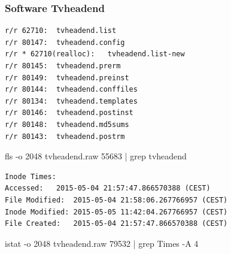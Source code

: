 \subsubsection{Software Tvheadend}

\begin{cmd}[H]
\begin{verbatim}
r/r 62710:	tvheadend.list
r/r 80147:	tvheadend.config
r/r * 62710(realloc):	tvheadend.list-new
r/r 80145:	tvheadend.prerm
r/r 80149:	tvheadend.preinst
r/r 80144:	tvheadend.conffiles
r/r 80134:	tvheadend.templates
r/r 80146:	tvheadend.postinst
r/r 80148:	tvheadend.md5sums
r/r 80143:	tvheadend.postrm
\end{verbatim}
\caption{fls -o 2048 tvheadend.raw 55683 | grep tvheadend}
\label{cmd:tvheadend-dpkg}
\end{cmd}

\begin{cmd}[H]
\begin{verbatim}
Inode Times:
Accessed:	2015-05-04 21:57:47.866570388 (CEST)
File Modified:	2015-05-04 21:58:06.267766957 (CEST)
Inode Modified:	2015-05-05 11:42:04.267766957 (CEST)
File Created:	2015-05-04 21:57:47.866570388 (CEST)
\end{verbatim}
\caption{istat -o 2048 tvheadend.raw 79532 | grep Times -A 4}
\label{cmd:tvheadend-rtlhdaccess}
\end{cmd}

